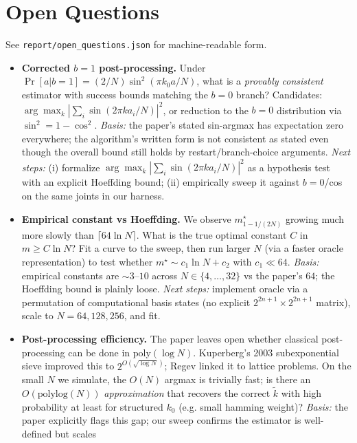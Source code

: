\documentclass[11pt]{article}
\begin{document}
\section{Open Questions}
See \texttt{report/open\_questions.json} for machine-readable form.

\begin{itemize}
  \item[Q1] \textbf{Corrected $b{=}1$ post-processing.} Under
    $\Pr[a|b{=}1] = (2/N)\sin^2(\pi k_0 a / N)$, what is a \emph{provably
    consistent} estimator with success bounds matching the $b{=}0$ branch?
    Candidates: $\arg\max_k |\sum_i \sin(2\pi k a_i/N)|^2$, or reduction to
    the $b{=}0$ distribution via $\sin^2 = 1 - \cos^2$. \emph{Basis:} the
    paper's stated sin-argmax has expectation zero everywhere; the algorithm's
    written form is not consistent as stated even though the overall bound
    still holds by restart/branch-choice arguments. \emph{Next steps:}
    (i) formalize $\arg\max_k |\sum_i \sin(2\pi k a_i/N)|^2$ as a
    hypothesis test with an explicit Hoeffding bound; (ii) empirically
    sweep it against $b{=}0$/cos on the same joints in our harness.
  \item[Q2] \textbf{Empirical constant vs Hoeffding.} We observe
    $m^{\star}_{1-1/(2N)}$ growing much more slowly than
    $\lceil 64\ln N\rceil$. What is the true optimal constant $C$ in
    $m \geq C\ln N$? Fit a curve to the sweep, then run larger $N$
    (via a faster oracle representation) to test whether
    $m^{\star} \sim c_1 \ln N + c_2$ with $c_1 \ll 64$.
    \emph{Basis:} empirical constants are $\sim 3$--$10$ across
    $N\in\{4,\dots,32\}$ vs the paper's $64$; the Hoeffding bound is
    plainly loose. \emph{Next steps:} implement oracle via a permutation
    of computational basis states (no explicit $2^{2n+1}\times 2^{2n+1}$
    matrix), scale to $N=64,128,256$, and fit.
  \item[Q3] \textbf{Post-processing efficiency.} The paper leaves open
    whether classical post-processing can be done in $\mathrm{poly}(\log N)$.
    Kuperberg's 2003 subexponential sieve improved this to
    $2^{O(\sqrt{\log N})}$; Regev linked it to lattice problems. On the
    small $N$ we simulate, the $O(N)$ argmax is trivially fast; is there
    an $O(\mathrm{polylog}(N))$ \emph{approximation} that recovers the
    correct $\tilde k$ with high probability at least for structured $k_0$
    (e.g. small hamming weight)? \emph{Basis:} the paper explicitly flags
    this gap; our sweep confirms the estimator is well-defined but scales

\end{itemize}
\end{document}
